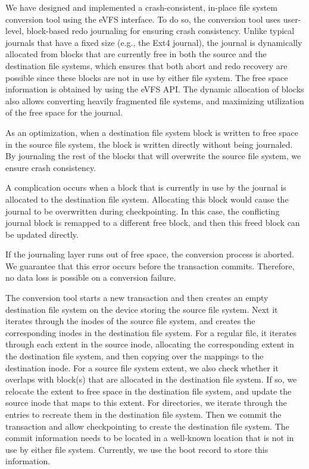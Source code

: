We have designed and implemented a crash-consistent, in-place file system conversion tool using the eVFS interface. To do so, the conversion tool uses user-level, block-based redo journaling for ensuring crash consistency. Unlike typical journals that have a fixed size (e.g., the Ext4 journal), the journal is dynamically allocated from blocks that are currently free in both the source and the destination file systems, which ensures that both abort and redo recovery are possible since these blocks are not in use by either file system. The free space information is obtained by using the eVFS API. The dynamic allocation of blocks also allows converting heavily fragmented file systems, and maximizing utilization of the free space for the journal.

As an optimization, when a destination file system block is written to free space in the source file system, the block is written directly without being journaled. By journaling the rest of the blocks that will overwrite the source file system, we ensure crash consistency.

A complication occurs when a block that is currently in use by the journal is allocated to the destination file system. Allocating this block would cause the journal to be overwritten during checkpointing. In this case, the conflicting journal block is remapped to a different free block, and then this freed block can be updated directly.

If the journaling layer runs out of free space, the conversion process is aborted. We guarantee that this error occurs before the transaction commits. Therefore, no data loss is possible on a conversion failure.
 
The conversion tool starts a new transaction and then creates an empty destination file system on the device storing the source file system. Next it iterates through the inodes of the source file system, and creates the corresponding inodes in the destination file system. For a regular file, it iterates through each extent in the source inode, allocating the corresponding extent in the destination file system, and then copying over the mappings to the destination inode. For a source file system extent, we also check whether it overlaps with block(s) that are allocated in the destination file system. If so, we relocate the extent to free space in the destination file system, and update the source inode that maps to this extent. For directories, we iterate through the entries to recreate them in the destination file system. Then we commit the transaction and allow checkpointing to create the destination file system. The commit information needs to be located in a well-known location that is not in use by either file system. Currently, we use the boot record to store this information.




